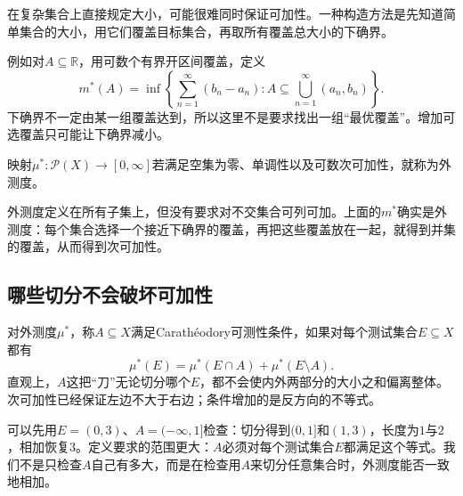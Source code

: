 \begin{center}
\end{center}


在复杂集合上直接规定大小，可能很难同时保证可加性。一种构造方法是先知道简单集合的大小，用它们覆盖目标集合，再取所有覆盖总大小的下确界。

例如对$A\subseteq\mathbb R$，用可数个有界开区间覆盖，定义
\[
 m^*(A)=\inf\left\{
 \sum_{n=1}^{\infty}(b_n-a_n):
 A\subseteq\bigcup_{n=1}^{\infty}(a_n,b_n)
 \right\}.
\]
下确界不一定由某一组覆盖达到，所以这里不是要求找出一组“最优覆盖”。增加可选覆盖只可能让下确界减小。

\begin{definition}[外测度]
映射$\mu^*:\mathcal P(X)\to[0,\infty]$若满足空集为零、单调性以及可数次可加性，就称为外测度。
\end{definition}

外测度定义在所有子集上，但没有要求对不交集合可列可加。上面的$m^*$确实是外测度：每个集合选择一个接近下确界的覆盖，再把这些覆盖放在一起，就得到并集的覆盖，从而得到次可加性。

\subsection{哪些切分不会破坏可加性}

对外测度$\mu^*$，称$A\subseteq X$满足Carath\'eodory可测性条件，如果对每个测试集合$E\subseteq X$都有
\[
 \boxed{\mu^*(E)=\mu^*(E\cap A)+\mu^*(E\setminus A).}
\]
直观上，$A$这把“刀”无论切分哪个$E$，都不会使内外两部分的大小之和偏离整体。次可加性已经保证左边不大于右边；条件增加的是反方向的不等式。

可以先用$E=(0,3)$、$A=(-\infty,1]$检查：切分得到$(0,1]$和$(1,3)$，长度为$1$与$2$，相加恢复$3$。定义要求的范围更大：$A$必须对每个测试集合$E$都满足这个等式。我们不是只检查$A$自己有多大，而是在检查用$A$来切分任意集合时，外测度能否一致地相加。


